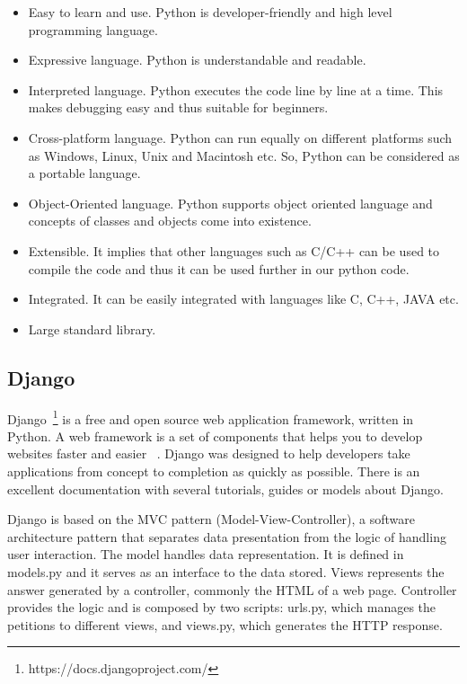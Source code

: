 \begin{itemize}
  \item Easy to learn and use. Python is developer-friendly and high level programming language.
  
  \item Expressive language. Python is understandable and readable.
  
  \item Interpreted language. Python executes the code line by line at a time. This makes debugging easy and thus suitable for beginners.
  
  \item Cross-platform language. Python can run equally on different platforms such as Windows, Linux, Unix and Macintosh etc. So, Python can be considered as a portable language.
  
  \item Object-Oriented language. Python supports object oriented language and concepts of classes and objects come into existence.
  
  \item Extensible. It implies that other languages such as C/C++ can be used to compile the code and thus it can be used further in our python code.
  
  \item Integrated. It can be easily integrated with languages like C, C++, JAVA etc.
  
  \item Large standard library.
  
\end{itemize}



\subsection{Django}
\label{subsec:django}

Django~\footnote{https://docs.djangoproject.com/} is a free and open source web application framework, written in Python. A web framework is a set of components that helps you to develop websites faster and easier ~\cite{djangogirls}. Django was designed to help developers take applications from concept to completion as quickly as possible. There is an excellent documentation with several tutorials, guides or models about Django.

Django is based on the MVC pattern (Model-View-Controller), a software architecture pattern that separates data presentation from the logic of handling user interaction. The model handles data representation. It is defined in models.py and it serves as an interface to the data stored. Views represents the answer generated by a controller, commonly the HTML of a web page. Controller provides the logic and is composed by two scripts: urls.py, which manages the petitions to different views, and views.py, which generates the HTTP response. 

